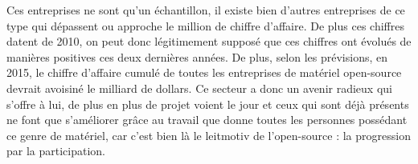 Ces entreprises ne sont qu'un échantillon, il existe bien d'autres entreprises de ce type qui dépassent ou approche le million de chiffre d'affaire. De plus ces chiffres datent de 2010, on peut donc légitimement supposé que ces chiffres ont évolués de manières positives ces deux dernières années. De plus, selon les prévisions, en 2015, le chiffre d'affaire cumulé de toutes les entreprises de matériel open-source devrait avoisiné le milliard de dollars.
\medskip
Ce secteur a donc un avenir radieux qui s'offre à lui, de plus en plus de projet voient le jour et ceux qui sont déjà présents ne font que s'améliorer grâce au travail que donne toutes les personnes possédant ce genre de matériel, car c'est bien là le leitmotiv de l'open-source : la progression par la participation.

